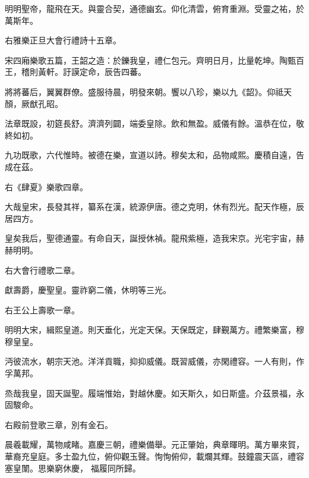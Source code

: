 \begin{pinyinscope}
 明明聖帝，龍飛在天。與靈合契，通德幽玄。仰化清雲，俯育重淵。受靈之祐，於萬斯年。



 右雅樂正旦大會行禮詩十五章。



 宋四廂樂歌五篇，王韶之造：於鑠我皇，禮仁包元。齊明日月，比量乾坤。陶甄百王，稽則黃軒。訏謨定命，辰告四蕃。



 將將蕃后，翼翼群僚。盛服待晨，明發來朝。饗以八珍，樂以九《韶》。仰祗天顏，厥猷孔昭。



 法章既設，初筵長舒。濟濟列闢，端委皇除。飲和無盈。威儀有餘。溫恭在位，敬終如初。



 九功既歌，六代惟時。被德在樂，宣道以詩。穆矣太和，品物咸熙。慶積自遠，告成在茲。


右《肆夏》樂歌四章。



 大哉皇宋，長發其祥，纂系在漢，統源伊唐。德之克明，休有烈光。配天作極，辰居四方。



 皇矣我后，聖德通靈。有命自天，誕授休禎。龍飛紫極，造我宋京。光宅宇宙，赫赫明明。


右大會行禮歌二章。



 獻壽爵，慶聖皇。靈祚窮二儀，休明等三光。


右王公上壽歌一章。



 明明大宋，緝熙皇道。則天垂化，光定天保。天保既定，肆覲萬方。禮繁樂富，穆穆皇皇。



 沔彼流水，朝宗天池。洋洋貢職，抑抑威儀。既習威儀，亦閑禮容。一人有則，作孚萬邦。



 烝哉我皇，固天誕聖。履端惟始，對越休慶。如天斯久，如日斯盛。介茲景福，永固駿命。



 右殿前登歌三章，別有金石。



 晨羲載耀，萬物咸睹。嘉慶三朝，禮樂備舉。元正肇始，典章暉明。萬方畢來賀，華裔充皇庭。多士盈九位，俯仰觀玉聲。恂恂俯仰，載爛其輝。鼓鐘震天區，禮容塞皇闈。思樂窮休慶，
 福履同所歸。




\end{pinyinscope}
